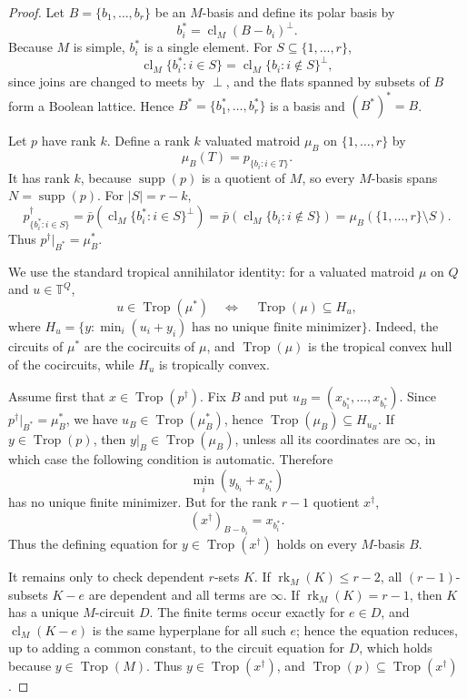 \documentclass[12pt]{article}
\theoremstyle{definition}
\newcommand{\T}{\mathbb T}
\newcommand{\Trop}{\operatorname{Trop}}
\newcommand{\rk}{\operatorname{rk}}
\newcommand{\cl}{\operatorname{cl}}
\newcommand{\supp}{\operatorname{supp}}
\begin{document}
\begin{proof}
Let \(B=\{b_1,\ldots,b_r\}\) be an \(M\)-basis and define its polar basis by
\[
b_i^*=\cl_M(B-b_i)^\perp.
\]
Because \(M\) is simple, \(b_i^*\) is a single element.  For \(S\subseteq\{1,\ldots,r\}\),
\[
\cl_M\{b_i^*:i\in S\}
=
\cl_M\{b_i:i\notin S\}^{\perp},
\]
since joins are changed to meets by \(\perp\), and the flats spanned by subsets of \(B\) form a Boolean lattice.  Hence \(B^*=\{b_1^*,\ldots,b_r^*\}\) is a basis and \((B^*)^*=B\).

Let \(p\) have rank \(k\).  Define a rank \(k\) valuated matroid \(\mu_B\) on \(\{1,\ldots,r\}\) by
\[
\mu_B(T)=p_{\{b_i:i\in T\}}.
\]
It has rank \(k\), because \(\supp(p)\) is a quotient of \(M\), so every \(M\)-basis spans \(N=\supp(p)\).  For \(|S|=r-k\),
\[
p^\dagger_{\{b_i^*:i\in S\}}
=
\bar p\!\left(\cl_M\{b_i^*:i\in S\}^{\perp}\right)
=
\bar p\!\left(\cl_M\{b_i:i\notin S\}\right)
=
\mu_B(\{1,\ldots,r\}\setminus S).
\]
Thus \(p^\dagger|_{B^*}=\mu_B^*\).

We use the standard tropical annihilator identity: for a valuated matroid \(\mu\) on \(Q\) and \(u\in\T^Q\),
\[
u\in\Trop(\mu^*)\quad\Longleftrightarrow\quad
\Trop(\mu)\subseteq H_u,
\]
where \(H_u=\{y:\min_i(u_i+y_i)\text{ has no unique finite minimizer}\}\).  Indeed, the circuits of \(\mu^*\) are the cocircuits of \(\mu\), and \(\Trop(\mu)\) is the tropical convex hull of the cocircuits, while \(H_u\) is tropically convex.

Assume first that \(x\in\Trop(p^\dagger)\).  Fix \(B\) and put \(u_B=(x_{b_1^*},\ldots,x_{b_r^*})\).  Since \(p^\dagger|_{B^*}=\mu_B^*\), we have \(u_B\in\Trop(\mu_B^*)\), hence \(\Trop(\mu_B)\subseteq H_{u_B}\).  If \(y\in\Trop(p)\), then \(y|_B\in\Trop(\mu_B)\), unless all its coordinates are \(\infty\), in which case the following condition is automatic.  Therefore
\[
\min_i(y_{b_i}+x_{b_i^*})
\]
has no unique finite minimizer.  But for the rank \(r-1\) quotient \(x^\dagger\),
\[
(x^\dagger)_{B-b_i}=x_{b_i^*}.
\]
Thus the defining equation for \(y\in\Trop(x^\dagger)\) holds on every \(M\)-basis \(B\).

It remains only to check dependent \(r\)-sets \(K\).  If \(\rk_M(K)\le r-2\), all \((r-1)\)-subsets \(K-e\) are dependent and all terms are \(\infty\).  If \(\rk_M(K)=r-1\), then \(K\) has a unique \(M\)-circuit \(D\).  The finite terms occur exactly for \(e\in D\), and \(\cl_M(K-e)\) is the same hyperplane for all such \(e\); hence the equation reduces, up to adding a common constant, to the circuit equation for \(D\), which holds because \(y\in\Trop(M)\).  Thus \(y\in\Trop(x^\dagger)\), and \(\Trop(p)\subseteq\Trop(x^\dagger)\).


\end{proof}
\end{document}
